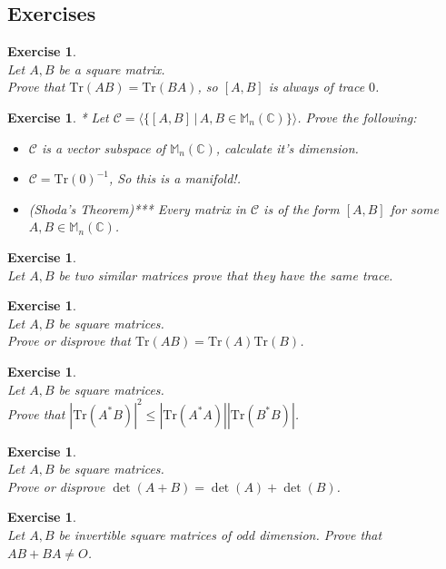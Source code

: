\documentclass[12pt]{article}
\newcommand{\double}{\hspace{2pt}}
\theoremstyle{definition}
\theoremstyle{remark}
\theoremstyle{plain}
\newtheorem{ex}[subsubsection]{Exercise}
\begin{document}
\subsection{Exercises}
\begin{ex}\leavevmode \\
	Let $A,B$ be a square matrix.\\ Prove that $ \mathrm{Tr}(AB)=\mathrm{Tr}(BA) $, so $[A,B]$ is always of trace $0$.
\end{ex}
\begin{ex}*
    Let $\mathscr{C}=\langle\{ [A,B] \double | \double A,B \in \mathbb{M}_n(\mathbb{C})\}\rangle$. Prove the following: \begin{itemize}
        \item $\mathscr{C}$ is a vector subspace of $\mathbb{M}_n(\mathbb{C})$, calculate it's dimension.
        \item $\mathscr{C}=\mathrm{Tr}(0)^{-1}$, So this is a manifold!.
        \item\textup{(Shoda's Theorem)}***  Every matrix in $\mathscr{C}$ is of the form $[A,B]$ for some $A,B\in \mathbb{M}_n(\mathbb{C})$.
    \end{itemize}
\end{ex}
\begin{ex}\leavevmode \\
    Let $A,B$ be two similar matrices prove that they have the same trace.
\end{ex}
\begin{ex}\leavevmode \\
	Let $ A,B $ be square matrices.\\ Prove or disprove that $ \mathrm{Tr}(AB)=\mathrm{Tr}(A)\mathrm{Tr}(B) $.
\end{ex}
\begin{ex}\leavevmode \\
	Let $ A,B $ be square matrices.\\ Prove that $|\mathrm{Tr}(A^*B)|^2 \leq |\mathrm{Tr}(A^*A)||\mathrm{Tr}(B^*B)|$.
\end{ex}
\begin{ex}\leavevmode \\
	Let $ A,B $ be square matrices.\\ Prove or disprove $ \det(A+B)=\det(A) + \det(B) $.
\end{ex}
\begin{ex}\leavevmode \\
	Let $ A,B $ be invertible square matrices of odd dimension. Prove that $ AB+BA \neq O $.
\end{ex}
\end{document}
